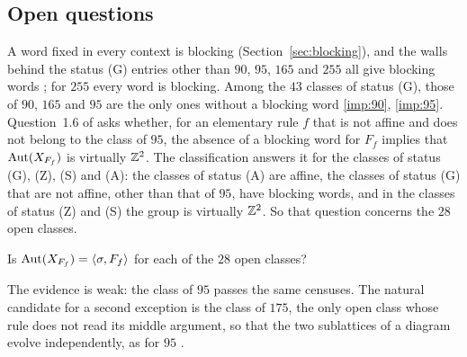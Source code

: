 \subsection{Open questions}
A word fixed in every context is blocking (Section~\ref{sec:blocking}), and the walls behind the status (G) entries other than $90$, $95$, $165$ and $255$ all give blocking words \cite{PaperC}; for $255$ every word is blocking. Among the $43$ classes of status (G), those of $90$, $165$ and $95$ are the only ones without a blocking word \eqref{imp:90}, \eqref{imp:95}. Question~1.6 of \cite{PaperC} asks whether, for an elementary rule $f$ that is not affine and does not belong to the class of $95$, the absence of a blocking word for $F_f$ implies that $\operatorname{Aut}(X_{F_f})$ is virtually $\mathbb{Z}^2$. The classification answers it for the classes of status (G), (Z), (S) and (A): the classes of status (A) are affine, the classes of status (G) that are not affine, other than that of $95$, have blocking words, and in the classes of status (Z) and (S) the group is virtually $\mathbb{Z}^2$. So that question concerns the $28$ open classes.

\begin{question}\label{q:open}
Is $\operatorname{Aut}(X_{F_f})=\langle\sigma,F_f\rangle$ for each of the $28$ open classes?
\end{question}

The evidence is weak: the class of $95$ passes the same censuses. The natural candidate for a second exception is the class of $175$, the only open class whose rule does not read its middle argument, so that the two sublattices of a diagram evolve independently, as for $95$ \cite[Remark~6.22]{PaperE}.

